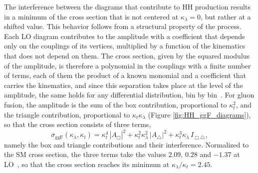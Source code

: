 The interference between the diagrams that contribute to HH production results in a minimum of the cross section that is not centered at $\kappa_{\lambda} = 0$, but rather at a shifted value. This behavior follows from a structural property of the process. Each LO diagram contributes to the amplitude with a coefficient that depends only on the couplings of its vertices, multiplied by a function of the kinematics that does not depend on them. The cross section, given by the squared modulus of the amplitude, is therefore a polynomial in the couplings with a finite number of terms, each of them the product of a known monomial and a coefficient that carries the kinematics, and since this separation takes place at the level of the amplitude, the same holds for any differential distribution, bin by bin~\cite{Carvalho:2016rys}. For gluon fusion, the amplitude is the sum of the box contribution, proportional to $\kappa_t^2$, and the triangle contribution, proportional to $\kappa_t\kappa_\lambda$ (Figure \ref{fig:HH_ggF_diagrams}), so that the cross section consists of three terms,
%
\begin{equation}
    \sigma_\text{ggF}(\kappa_\lambda, \kappa_t)
    = \kappa_t^4\, |A_{\Box}|^2
    + \kappa_t^2\kappa_\lambda^2\, |A_{\triangle}|^2
    + \kappa_t^3\kappa_\lambda\, I_{\Box\triangle},
    \label{eq:kl_kt_ggf}
\end{equation}
%
namely the box and triangle contributions and their interference. Normalized to the SM cross section, the three terms take the values $2.09$, $0.28$ and $-1.37$ at LO~\cite{Carvalho:2016rys}, so that the cross section reaches its minimum at $\kappa_\lambda/\kappa_t = 2.45$.\medskip

